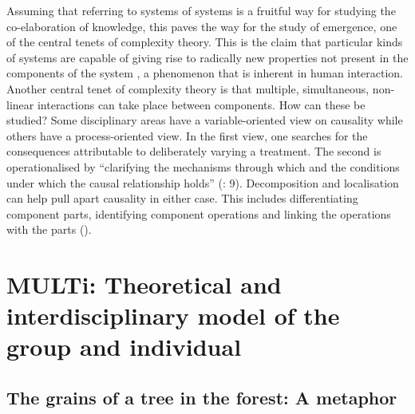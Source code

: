 \documentclass[output=paper]{langscibook}
\begin{document}
Assuming that referring to systems of systems is a fruitful way for studying the co-elab\-o\-ration of knowledge, this paves the way for the study of emergence, one of the central tenets of complexity theory. This is the claim that particular kinds of systems are capable of giving rise to radically new properties not present in the components of the system \citep{BechtelRichardson2010}, a phenomenon that is inherent in human interaction. Another central tenet of complexity theory is that multiple, simultaneous, non-linear interactions can take place between components. How can these be studied? Some disciplinary areas have a variable-oriented view on causality while others have a process-oriented view. In the first view, one searches for the consequences attributable to deliberately varying a treatment. The second is operationalised by “clarifying the mechanisms through which and the conditions under which the causal relationship holds” (\citealt{ShadishEtAl2002}: 9).  Decomposition and localisation \citep{BechtelRichardson2010} can help pull apart causality in either case. This includes differentiating component parts, identifying component operations and linking the operations with the parts (\citealt{BechtelAbrahamsen2005}).

\section{MULTi: Theoretical and interdisciplinary model of the group and individual} 
\subsection{The grains of a tree in the forest: A metaphor}
\end{document}
